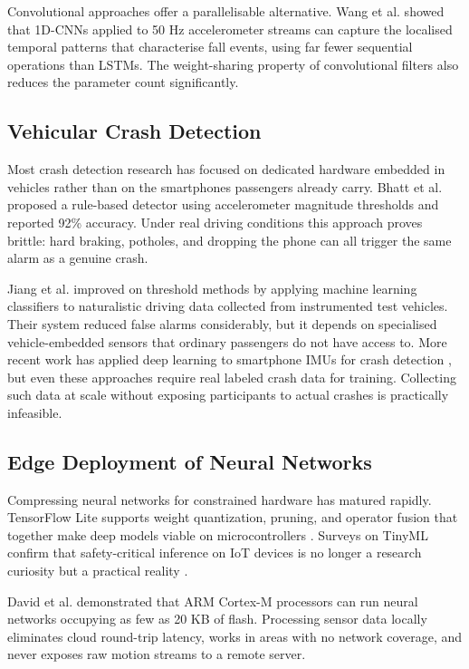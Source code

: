 Convolutional approaches offer a parallelisable alternative. Wang et al. \citep{wang2020cnn} showed that 1D-CNNs applied to 50 Hz accelerometer streams can capture the localised temporal patterns that characterise fall events, using far fewer sequential operations than LSTMs. The weight-sharing property of convolutional filters also reduces the parameter count significantly.

\subsection{Vehicular Crash Detection}

Most crash detection research has focused on dedicated hardware embedded in vehicles rather than on the smartphones passengers already carry. Bhatt et al. \citep{bhatt2017} proposed a rule-based detector using accelerometer magnitude thresholds and reported 92\% accuracy. Under real driving conditions this approach proves brittle: hard braking, potholes, and dropping the phone can all trigger the same alarm as a genuine crash.

Jiang et al. \citep{jiang2020} improved on threshold methods by applying machine learning classifiers to naturalistic driving data collected from instrumented test vehicles. Their system reduced false alarms considerably, but it depends on specialised vehicle-embedded sensors that ordinary passengers do not have access to. More recent work has applied deep learning to smartphone IMUs for crash detection \citep{smartphone_crash2024}, but even these approaches require real labeled crash data for training. Collecting such data at scale without exposing participants to actual crashes is practically infeasible.

\subsection{Edge Deployment of Neural Networks}

Compressing neural networks for constrained hardware has matured rapidly. TensorFlow Lite supports weight quantization, pruning, and operator fusion that together make deep models viable on microcontrollers \citep{tflite_micro}. Surveys on TinyML confirm that safety-critical inference on IoT devices is no longer a research curiosity but a practical reality \citep{tinyml2023, edge_safety2024}.

David et al. \citep{david2021} demonstrated that ARM Cortex-M processors can run neural networks occupying as few as 20 KB of flash. Processing sensor data locally eliminates cloud round-trip latency, works in areas with no network coverage, and never exposes raw motion streams to a remote server.

